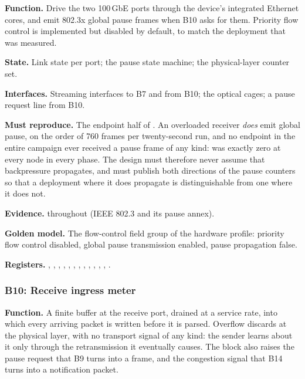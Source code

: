 \textbf{Function.} Drive the two 100\,GbE ports through the device's integrated
Ethernet cores, and emit 802.3x global pause frames when B10 asks for them.
Priority flow control is implemented but disabled by default, to match the
deployment that was measured.

\textbf{State.} Link state per port; the pause state machine; the physical-layer
counter set.

\textbf{Interfaces.} Streaming interfaces to B7 and from B10; the optical cages;
a pause request line from B10.

\textbf{Must reproduce.} The endpoint half of . An overloaded receiver
\emph{does} emit global pause, on the order of 760 frames per twenty-second
run, and no endpoint in the entire campaign ever received a pause frame of any
kind:  was exactly zero at every node in every phase.
The design must therefore never assume that backpressure propagates, and must
publish both directions of the pause counters so that a deployment where it
does propagate is distinguishable from one where it does not.

\textbf{Evidence.} \evdoc{} throughout (IEEE 802.3 and its pause annex).

\textbf{Golden model.} The flow-control field group of the hardware profile:
priority flow control disabled, global pause transmission enabled, pause
propagation false.

{\raggedright
\textbf{Registers.} , ,
, , ,
, ,
, ,
, , ,
.\par}

\subsubsection{B10: Receive ingress meter}

\textbf{Function.} A finite buffer at the receive port, drained at a service
rate, into which every arriving packet is written before it is parsed. Overflow
discards at the physical layer, with no transport signal of any kind: the
sender learns about it only through the retransmission it eventually causes.
The block also raises the pause request that B9 turns into a frame, and the
congestion signal that B14 turns into a notification packet.

